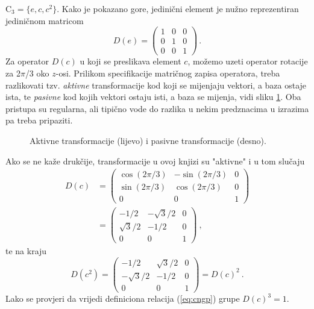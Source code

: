   
\begin{primjer}
    \label{pr:repC3} 
C$_3=\{e, c, c^2\}$. Kako je pokazano gore, jedinični element je
nužno reprezentiran jediničnom matricom
\begin{equation}
D(e)=\left(
\begin{array}{ccc}
1 & 0 & 0 \\
0 & 1 & 0 \\
0 & 0 & 1
\end{array}\right) \,.
\label{eq:c3rep1}
\end{equation}
Za operator $D(c)$ u koji se preslikava element $c$, možemo
uzeti operator rotacije za 2$\pi$/3 oko $z$-osi.
Prilikom specifikacije matričnog zapisa operatora, 
treba razlikovati tzv. \emph{aktivne} transformacije kod
koji se mijenjaju vektori, a baza ostaje ista, te \emph{pasivne} kod
kojih vektori ostaju isti, a baza se mijenja, vidi sliku \ref{fig:aktivne}.
Oba pristupa su regularna, ali tipično vode do razlika u nekim predznacima u izrazima
pa treba pripaziti.
\begin{figure}[htpb]
    \centering
    
    \caption{Aktivne transformacije (lijevo) i pasivne transformacije (desno).}
    \label{fig:aktivne}
\end{figure}
Ako se ne kaže drukčije, transformacije u ovoj knjizi su "aktivne"
i u tom slučaju
\begin{equation}
\begin{split}
    D(c)& =\left(
\begin{array}{ccc}
\cos(2\pi/3) & -\sin(2\pi/3) & 0 \\
\sin(2\pi/3) & \cos(2\pi/3) & 0 \\
0 & 0 & 1
\end{array}\right) \\
  & =\left(
\begin{array}{ccc}
-1/2 & -\sqrt{3}/2 & 0 \\
\sqrt{3}/2 & -1/2 & 0 \\
0 & 0 & 1
\end{array}\right) \:,
\end{split}
\label{eq:c3rep2}
\end{equation}
te na kraju
\begin{equation}
D(c^2)=
\left(
\begin{array}{ccc}
-1/2 & \sqrt{3}/2 & 0 \\
-\sqrt{3}/2 & -1/2 & 0 \\
0 & 0 & 1
\end{array}\right) = D(c)^2  \:.
\label{eq:c3rep3}
\end{equation}
Lako se provjeri da vrijedi definiciona relacija (\ref{eq:cngp}) grupe
$D(c)^3 = 1$.
\end{primjer}


